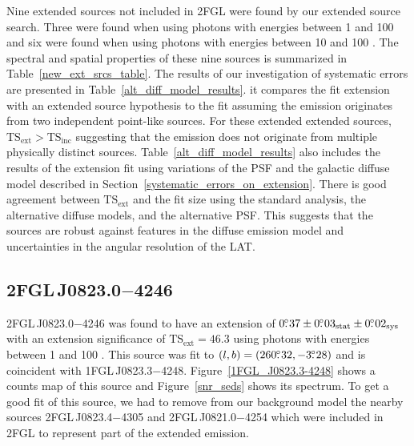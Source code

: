 \documentclass[12pt,preprint]{aastex}
\newcommand{\gev}{\text{GeV}\xspace}
\newcommand{\tsext}{{\ensuremath{\text{TS}_{\text{ext}}}}\xspace}
\newcommand{\tsinc}{\ensuremath{\text{TS}_{\text{inc}}}\xspace}
\newcommand{\sys}{\text{sys}\xspace}
\newcommand{\stat}{\text{stat}\xspace}
\begin{document}

Nine extended sources not included in 2FGL were found by our 
extended source search.
Three were found when using photons with energies between 1 \gev
and 100 \gev and six were found when using photons with energies
between 10 \gev and 100 \gev.  The spectral and spatial properties of
these nine sources is summarized in Table~\ref{new_ext_srcs_table}.
The results of our investigation of systematic errors 
are presented in Table~\ref{alt_diff_model_results}.  it 
compares the fit extension with an extended source hypothesis
to the fit assuming the emission originates from two independent
point-like sources. For these extended extended sources,
$\tsext>\tsinc$ suggesting that the \gev emission does not originate
from multiple physically distinct sources.
Table~\ref{alt_diff_model_results}
also includes the results of the extension fit
using variations of the PSF and the galactic diffuse model described
in Section~\ref{systematic_errors_on_extension}.  There is good
agreement between \tsext and the fit size using the standard analysis,
the alternative diffuse models, and the alternative PSF.  This suggests
that the sources are robust against features in the diffuse emission
model and uncertainties in the angular resolution of the LAT.

\subsection{2FGL\,J0823.0$-$4246}
\label{section_2FGL_J0823.0-4246}


2FGL\,J0823.0$-$4246 was found 
to have an 
extension of $0\fdg37\pm0\fdg03_\stat\pm0\fdg02_\sys$ 
with an extension
significance of $\tsext=46.3$
using 
 photons with energies between
1 \gev and 100 \gev.  This source was fit to 
$(l,b)=(260\mbox{$.\!\!^\circ$}32,-3\mbox{$.\!\!^\circ$}28)$ and
is coincident with 1FGL\,J0823.3$-$4248.
Figure~\ref{1FGL_J0823.3-4248} shows a
counts map of this source
and Figure~\ref{snr_seds} shows its spectrum.
To get a good fit of this source, we had to remove from our background
model the nearby sources 2FGL\,J0823.4$-$4305 and 2FGL\,J0821.0$-$4254
which were included in 2FGL to represent part of the
extended emission.  
\end{document}

